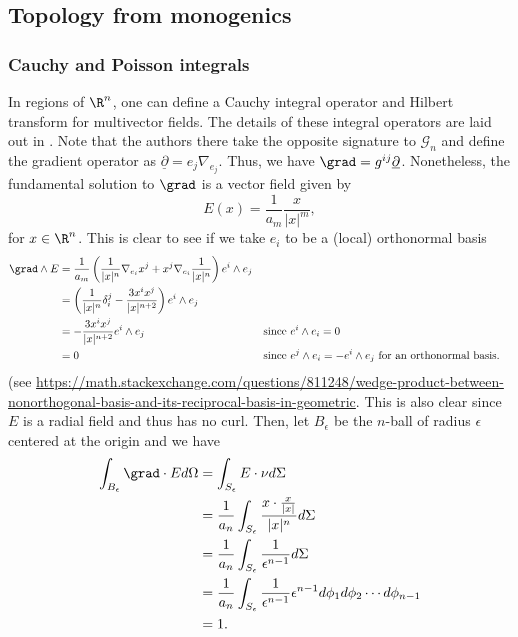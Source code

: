 \subsection{Topology from monogenics}

\subsubsection{Cauchy and Poisson integrals}

In regions of $\R^n$, one can define a Cauchy integral operator and Hilbert transform for multivector fields.  The details of these integral operators are laid out in \cite{brackx_hilbert_2008}. Note that the authors there take the opposite signature to $\mathcal{G}_n$ and define the gradient operator as $\underline{\partial} = e_j \nabla_{e_j}$.  Thus, we have $\grad = g^{ij} \underline{\partial}$.  Nonetheless, the fundamental solution to $\grad$ is a vector field given by
\[
E(x) = \frac{1}{a_m} \frac{x}{|x|^m},
\]
for $x\in \R^n$.  This is clear to see if we take $e_i$ to be a (local) orthonormal basis
\begin{align*}
\grad \wedge E &= \frac{1}{a_m}  \left( \frac{1}{|x|^n} \nabla_{e_i} x^j + x^j \nabla_{e_i} \frac{1}{|x|^n} \right) e^i \wedge e_j\\
&= \left( \frac{1}{|x|^n} \delta_i^j -\frac{3x^ix^j}{|x|^{n+2}} \right) e^i \wedge e_j\\
&= -\frac{3x^i x^j}{|x|^{n+2}} e^i \wedge e_j &&\textrm{since $e^i \wedge e_i=0$}\\
&= 0 &&\textrm{since $e^j\wedge e_i = -e^i \wedge e_j$ for an orthonormal basis.}
\end{align*}
(see \url{https://math.stackexchange.com/questions/811248/wedge-product-between-nonorthogonal-basis-and-its-reciprocal-basis-in-geometric}. This is also clear since $E$ is a radial field and thus has no curl. Then, let $B_{\epsilon}$ be the $n$-ball of radius $\epsilon$ centered at the origin and we have
\begin{align*}
\int_{B_\epsilon} \grad \cdot Ed \Omega &= \int_{S_\epsilon} E \cdot \nu d\Sigma\\
&=\frac{1}{a_n} \int_{S_\epsilon} \frac{x\cdot \frac{x}{|x|}}{|x|^n} d\Sigma\\
&= \frac{1}{a_n} \int_{S_\epsilon} \frac{1}{\epsilon^{n-1}} d\Sigma\\
&= \frac{1}{a_n} \int_{S_\epsilon} \frac{1}{\epsilon^{n-1}} \epsilon^{n-1} d\phi_1 d\phi_2 \cdots d\phi_{n-1}\\
&= 1.
\end{align*}

